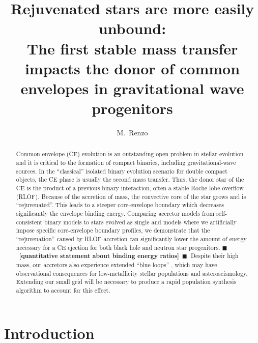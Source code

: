 \documentclass[twocolumn,twocolappendix,trackchanges]{aastex63}
\newcommand{\todo}[1]{{\large $\blacksquare$~\textbf{\color{red}[#1]}}~$\blacksquare$}
\begin{document}
\graphicspath{{./figures/}}

\title{Rejuvenated stars are more easily unbound:\\ The first stable
  mass transfer impacts the donor of common envelopes in gravitational wave progenitors}

\author[0000-0002-6718-9472]{M.~Renzo}




\begin{abstract}
  Common envelope (CE) evolution is an outstanding open problem in
  stellar evolution and it is critical to the formation of compact
  binaries, including gravitational-wave sources. In the ``classical''
  isolated binary evolution scenario for double compact objects, the
  CE phase is usually the second mass transfer. Thus, the donor star
  of the CE is the product of a previous binary interaction, often a
  stable Roche lobe overflow (RLOF). Because of the accretion of mass,
  the convective core of the star grows and is ``rejuvenated''. This
  leads to a steeper core-envelope boundary which decreases
  significantly the envelope binding energy. Comparing accretor models
  from self-consistent binary models to stars evolved as single and
  models where we artificially impose specific core-envelope boundary
  profiles, we demonstrate that the ``rejuvenation'' caused by
  RLOF-accretion can significantly lower the amount of energy necessary
  for a CE ejection for both black hole and neutron star progenitors.
  \todo{quantitative statement about binding energy ratios}.
  Despite their high mass, our accretors also experience extended
  ``blue loops'' , which may have observational consequences for
  low-metallicity stellar populations and asteroseismology. Extending
  our small grid will be necessary to produce a rapid population
  synthesis algorithm to account for this effect.
\end{abstract}


\section{Introduction}
\label{sec:intro}
\end{document}
